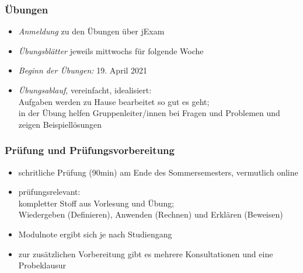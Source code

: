 \documentclass[aspectratio=1610,onlymath]{beamer}
\begin{document}
\begin{frame}\frametitle{Übungen}
\begin{itemize}
\item \emph{Anmeldung} zu den Übungen über jExam
\item \emph{Übungsblätter} jeweils mittwochs für folgende Woche
\item \emph{Beginn der Übungen:} 19. April 2021
\item \emph{Übungsablauf}, vereinfacht, idealisiert:\\
	Aufgaben werden zu Hause bearbeitet so gut es geht;\\
	in der Übung helfen Gruppenleiter/innen bei Fragen und Problemen und zeigen Beispiellösungen
\end{itemize}

\end{frame}


\begin{frame}\frametitle{Prüfung und Prüfungsvorbereitung}
\begin{itemize}
\item schritliche Prüfung (90min) am Ende des Sommersemesters, vermutlich online
\item prüfungsrelevant:\\
	kompletter Stoff aus Vorlesung \alert{und} Übung;\\
	Wiedergeben (Definieren), Anwenden (Rechnen) und Erklären (Beweisen)
\item Modulnote ergibt sich je nach Studiengang
\item zur zusätzlichen Vorbereitung gibt es \alert{mehrere Konsultationen} und \alert{eine Probeklausur}
\end{itemize}

\end{frame}
\end{document}
